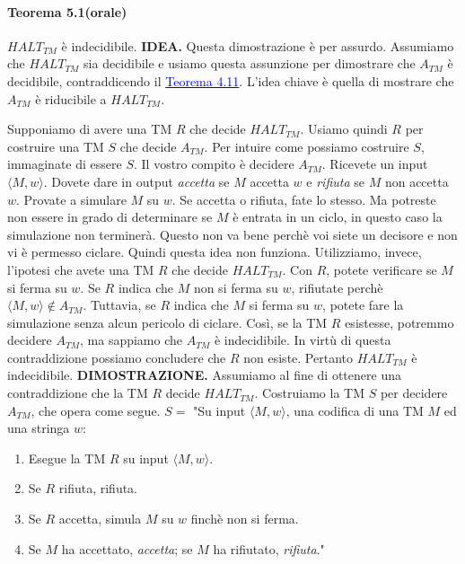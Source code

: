 \documentclass{article}
\begin{document}
\paragraph{Teorema 5.1(orale)}
\label{teorema-5.1}
\text{}
\newline
$HALT_{TM}$ è indecidibile.
\vspace{1em}
\text{}
\newline
\hbox{\textbf{IDEA.}}
Questa dimostrazione è per assurdo.
Assumiamo che $HALT_{TM}$ sia decidibile e usiamo questa assunzione per dimostrare che $A_{TM}$ è decidibile, contraddicendo il \hyperref[teorema-4.11]{\textcolor{blue}{Teorema 4.11}}.
L'idea chiave è quella di mostrare che $A_{TM}$ è riducibile a $HALT_{TM}$.

Supponiamo di avere una TM $R$ che decide $HALT_{TM}$.
Usiamo quindi $R$ per costruire una TM $S$ che decide $A_{TM}$.
Per intuire come possiamo costruire $S$, immaginate di essere $S$.
Il vostro compito è decidere $A_{TM}$.
Ricevete un input $\langle M,w \rangle$.
Dovete dare in output \textit{accetta} se $M$ accetta $w$ e \textit{rifiuta} se $M$ non accetta $w$.
Provate a simulare $M$ su $w$.
Se accetta o rifiuta, fate lo stesso.
Ma potreste non essere in grado di determinare se $M$ è entrata in un ciclo, in questo caso la simulazione non terminerà.
Questo non va bene perchè voi siete un decisore e non vi è permesso ciclare.
Quindi questa idea non funziona.
Utilizziamo, invece, l'ipotesi che avete una TM $R$ che decide $HALT_{TM}$.
Con $R$, potete verificare se $M$ si ferma su $w$.
Se $R$ indica che $M$ non si ferma su $w$, rifiutate perchè $\langle M,w \rangle \notin A_{TM}$.
Tuttavia, se $R$ indica che $M$ si ferma su $w$, potete fare la simulazione senza alcun pericolo di ciclare.
Così, se la TM $R$ esistesse, potremmo decidere $A_{TM}$, ma sappiamo che $A_{TM}$ è indecidibile.
In virtù di questa contraddizione possiamo concludere che $R$ non esiste.
Pertanto $HALT_{TM}$ è indecidibile.
\vspace{1em}
\text{}
\newline
\hbox{\textbf{DIMOSTRAZIONE.}}
Assumiamo al fine di ottenere una contraddizione che la TM $R$ decide $HALT_{TM}$.
Costruiamo la TM $S$ per decidere $A_{TM}$, che opera come segue.
\vspace{1em}
\text{}
\newline
$S = $ "Su input $\langle M,w \rangle$, una codifica di una TM $M$ ed una stringa $w$:
\begin{enumerate}
    \item Esegue la TM $R$ su input $\langle M,w \rangle$.
    \item Se $R$ rifiuta, rifiuta.
    \item Se $R$ accetta, simula $M$ su $w$ finchè non si ferma.
    \item Se $M$ ha accettato, \textit{accetta}; se $M$ ha rifiutato, \textit{rifiuta}."
\end{enumerate}
\end{document}

